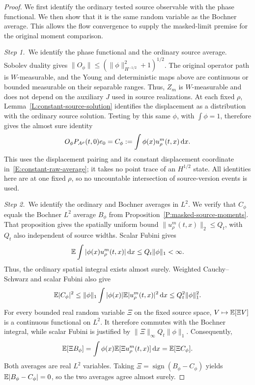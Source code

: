 \begin{proof}
  We first identify the ordinary tested source observable with the phase
  functional. We then show that it is the same random variable as the Bochner
  average. This allows the flow convergence to supply the masked-limit premise
  for the original moment comparison.

  \medskip
  \noindent\textit{Step 1.~}We identify the phase functional and the ordinary
  source average.
  Sobolev duality gives $\|O_\phi\| \le (\|\phi\|_{H^{-1/2}}^2+1)^{1/2}$. The
  original operator path is $W$-measurable, and the Young and deterministic maps
  above are continuous or bounded measurable on their separable ranges. Thus,
  $Z_m$ is $W$-measurable and does not depend on the auxiliary $J$ used in
  source realizations. At each fixed $\rho$,
  Lemma~\ref{L:constant-source-solution} identifies the displacement as a
  distribution with the ordinary source solution. Testing by this same $\phi$,
  with $\int\phi = 1$, therefore gives the almost sure identity
  \[
    O_\phi P_{A^\rho}(t,0)e_0
    =C_\phi:=\int\phi(x)u_\rho^m(t,x)\,\mathrm{d} x.
  \]
  This uses the displacement pairing and its constant displacement coordinate
  in~\eqref{E:constant-raw-average}; it takes no point trace of an $H^{1/2}$
  state. All identities here are at one fixed $\rho$, so no uncountable
  intersection of source-version events is used.

  \medskip
  \noindent\textit{Step 2.~}We identify the ordinary and Bochner averages in
  $L^2$.
  We verify that $C_\phi$ equals the Bochner $L^2$ average $B_\phi$ from
  Proposition~\ref{P:masked-source-moments}. That proposition gives the
  spatially uniform bound $\|u_\rho^m(t,x)\|_2 \le Q_t$, with $Q_t$ also
  independent of source widths. Scalar Fubini gives
  \[
    \mathbb{E}\int|\phi(x)u_\rho^m(t,x)|\,\mathrm{d} x
    \le Q_t\|\phi\|_1<\infty.
  \]
  Thus, the ordinary spatial integral exists almost surely. Weighted
  Cauchy--Schwarz and scalar Fubini also give
  \[
    \mathbb{E}|C_\phi|^2
    \le\|\phi\|_1\int|\phi(x)|\mathbb{E}|u_\rho^m(t,x)|^2\,\mathrm{d} x
    \le Q_t^2\|\phi\|_1^2.
  \]
  For every bounded real random variable $\Xi$ on the fixed source space,
  $V\mapsto\mathbb{E}[\Xi V]$ is a continuous functional on $L^2$. It therefore commutes
  with the Bochner integral, while scalar Fubini is justified by $\|\Xi\|_\infty
  Q_t\|\phi\|_1$. Consequently,
  \[
    \mathbb{E}[\Xi B_\phi]
    =\int\phi(x)\mathbb{E}[\Xi u_\rho^m(t,x)]\,\mathrm{d} x
    =\mathbb{E}[\Xi C_\phi].
  \]
  Both averages are real $L^2$ variables. Taking $\Xi =
  \operatorname{sign}(B_\phi-C_\phi)$ yields $\mathbb{E}|B_\phi-C_\phi| = 0$, so the two
  averages agree almost surely.


\end{proof}
